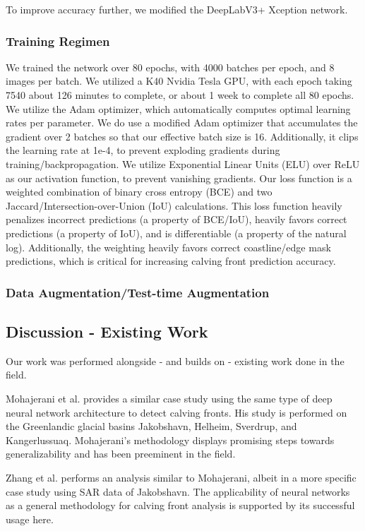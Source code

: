 \documentclass[tc, manuscript]{copernicus}
\begin{document}
To improve accuracy further, we modified the DeepLabV3+ Xception network. 

\subsubsection{Training Regimen}
We trained the network over 80 epochs, with 4000 batches per epoch, and 8 images per batch. We utilized a K40 Nvidia Tesla GPU, with each epoch taking 7540 about 126 minutes to complete, or about 1 week to complete all 80 epochs. We utilize the Adam optimizer, which automatically computes optimal learning rates per parameter. We do use a modified Adam optimizer that accumulates the gradient over 2 batches so that our effective batch size is 16. Additionally, it clips the learning rate at 1e-4, to prevent exploding gradients during training/backpropagation.
We utilize Exponential Linear Units (ELU) over ReLU as our activation function, to prevent vanishing gradients. Our loss function is a weighted combination of binary cross entropy (BCE) and two Jaccard/Intersection-over-Union (IoU) calculations. 
This loss function heavily penalizes incorrect predictions (a property of BCE/IoU), heavily favors correct predictions (a property of IoU), and is differentiable (a property of the natural log). Additionally, the weighting heavily favors correct coastline/edge mask predictions, which is critical for increasing calving front prediction accuracy.
\subsubsection{Data Augmentation/Test-time Augmentation}

\subsection{Discussion - Existing Work}
Our work was performed alongside - and builds on - existing work done in the field.

Mohajerani et al.\citep{mohajerani2019} provides a similar case study using the same type of deep neural network architecture to detect calving fronts. His study is performed on the Greenlandic glacial basins Jakobshavn, Helheim, Sverdrup, and Kangerlussuaq. Mohajerani's methodology displays promising steps towards generalizability and has been preeminent in the field.

Zhang et al.\citep{zhang2019} performs an analysis similar to Mohajerani, albeit in a more specific case study using SAR data of Jakobshavn. The applicability of neural networks as a general methodology for calving front analysis is supported by its successful usage here. 
\end{document}
